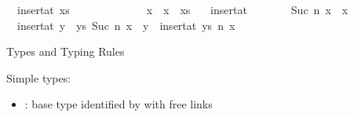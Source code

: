 \begin{isabellebody}
\ \ {\isachardoublequoteopen}insert{\isacharunderscore}{\kern0pt}at\ xs\ \ \ \ \ \ \ {}\ \ \ \ \ \ \ x\ {\isacharequal}{\kern0pt}\ x\ {\isacharhash}{\kern0pt}\ xs{\isachardoublequoteclose}\ {\isacharbar}{\kern0pt}\isanewline
\ \ {\isachardoublequoteopen}insert{\isacharunderscore}{\kern0pt}at\ {\isacharbrackleft}{\kern0pt}{\isacharbrackright}{\kern0pt}\ \ \ \ \ \ \ {\isacharparenleft}{\kern0pt}Suc\ n{\isacharparenright}{\kern0pt}\ x\ {\isacharequal}{\kern0pt}\ {\isacharbrackleft}{\kern0pt}x{\isacharbrackright}{\kern0pt}{\isachardoublequoteclose}\ {\isacharbar}{\kern0pt}\isanewline
\ \ {\isachardoublequoteopen}insert{\isacharunderscore}{\kern0pt}at\ {\isacharparenleft}{\kern0pt}y\ {\isacharhash}{\kern0pt}\ ys{\isacharparenright}{\kern0pt}\ {\isacharparenleft}{\kern0pt}Suc\ n{\isacharparenright}{\kern0pt}\ x\ {\isacharequal}{\kern0pt}\ y\ {\isacharhash}{\kern0pt}\ insert{\isacharunderscore}{\kern0pt}at\ ys\ n\ x{\isachardoublequoteclose}%
\begin{isamarkuptext}%
Types and Typing Rules%
\end{isamarkuptext}\isamarkuptrue%
%
\begin{isamarkuptext}%
Simple types:

%
\begin{itemize}%
\item {} : base type identified by  with free links 


\end{itemize}
\end{isamarkuptext}
\end{isabellebody}
